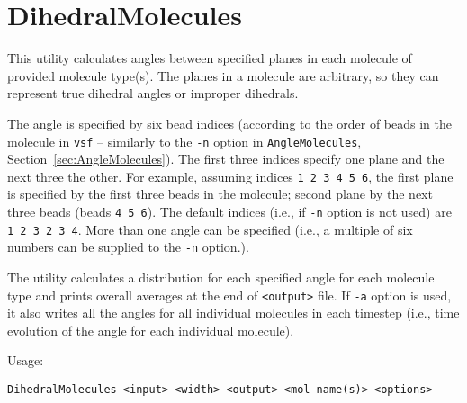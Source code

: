\section{DihedralMolecules} \label{sec:DihedralMolecules}

This utility calculates angles between specified planes in each molecule of
provided molecule type(s). The planes in a molecule are arbitrary, so they
can represent true dihedral angles or improper dihedrals.

The angle is specified by six bead indices (according to the order of beads
in the molecule in \texttt{vsf} -- similarly to the \texttt{-n} option in
\texttt{AngleMolecules}, Section~\ref{sec:AngleMolecules}). The
first three indices specify one plane and the next three the other. For
example, assuming indices \texttt{1 2 3 4 5 6}, the first plane is
specified by the first three beads in the molecule; second plane by the
next three beads (beads \texttt{4 5 6}). The default indices
(i.e., if \texttt{-n} option is not used) are \texttt{1 2 3 2 3 4}. More
than one angle can be specified (i.e., a multiple of six numbers can be
supplied to the \texttt{-n} option.).

The utility calculates a distribution for each specified angle for each
molecule type and prints overall averages at the end of \texttt{<output>}
file. If \texttt{-a} option is used, it also writes all the angles for
all individual molecules in each timestep (i.e., time evolution of the
angle for each individual molecule).

Usage:

\vspace{1em}
\noindent
\texttt{DihedralMolecules <input> <width> <output> <mol name(s)> <options>}


